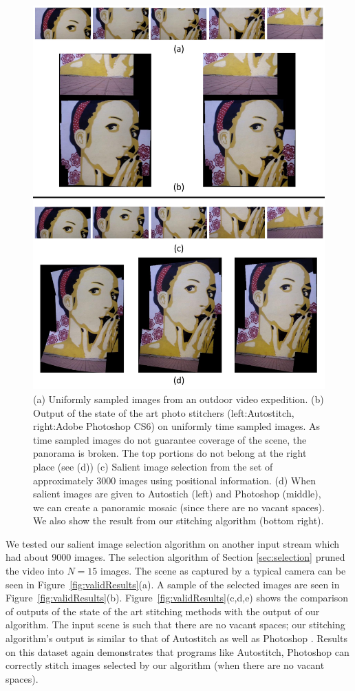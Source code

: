 \documentclass[11pt]{article}
\begin{document}
\begin{figure}[h!]
\centering
\includegraphics[width=0.87\linewidth]{mosaicing/results/ValidationResult}
\caption{ (a) Uniformly sampled images from an outdoor video
  expedition.  (b) Output of the state of the art photo stitchers
  (left:Autostitch, right:Adobe Photoshop CS6) on uniformly time
  sampled images.  As time sampled images do not guarantee coverage of
  the scene, the panorama is broken. The top portions do not belong at
  the right place (see (d)) (c) Salient image selection from the set of
  approximately 3000 images using positional information. (d) When
  salient images are given to Autostich (left) and Photoshop (middle),
  we can create a panoramic mosaic (since there are no vacant
  spaces). We also show the result from our stitching algorithm
  (bottom right).}
\label{fig:sac3}
\end{figure}

We tested our salient image selection algorithm on another
input stream which had about 9000 images. The selection algorithm of Section
\ref{sec:selection} pruned the video into $N=15$ images. The scene as captured
by a typical camera can  be seen in Figure~\ref{fig:validResults}(a). A sample
of the selected images are seen in Figure~\ref{fig:validResults}(b).
Figure~\ref{fig:validResults}(c,d,e) shows the comparison of outputs of the state
of the art stitching methods with the output of our algorithm. The input scene
is such that there are no vacant spaces; our stitching algorithm's output is
similar to that of Autostitch \cite{autostitch} as well as Photoshop
\cite{photoshop}. Results on this dataset again demonstrates that programs like
Autostitch, Photoshop can correctly stitch images selected by our algorithm
(when there are no vacant spaces).
\end{document}

